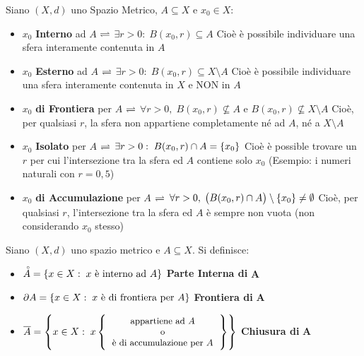 \begin{definition}
	\label{def:pti_e_spa_metr}
	Siano $(X,d)$ uno Spazio Metrico, $A \subseteq X$ e $x_0 \in X$:
	\begin{itemize}
		\item $x_0$ \textbf{Interno} ad $A$ \quad $\rightleftharpoons$ \quad $\exists r > 0:\; B(x_0, r) \subseteq A$\newline
			{\footnotesize Cioè è possibile individuare una sfera interamente contenuta in $A$}
		\item $x_0$ \textbf{Esterno} ad $A$ \quad $\rightleftharpoons$ \quad $\exists r > 0:\; B(x_0, r) \subseteq X \setminus A$\newline
			{\footnotesize Cioè è possibile individuare una sfera interamente contenuta in $X$ e NON in $A$}
		\item $x_0$ \textbf{di Frontiera} per $A$ \quad $\rightleftharpoons$ \quad $\forall r > 0,\; B(x_0, r) \nsubseteq A \text{ e } B(x_0, r) \nsubseteq X \setminus A$\newline
			{\footnotesize Cioè, per qualsiasi $r$, la sfera non appartiene completamente né ad $A$, né a $X \setminus A$}
		\item $x_0$ \textbf{Isolato} per $A$ \quad $\rightleftharpoons$ \quad $\exists r > 0:\; B(x_0, r) \cap A = \left\{x_0\right\}$\newline
			{\footnotesize Cioè è possible trovare un $r$ per cui l'intersezione tra la sfera ed $A$ contiene solo $x_0$ (Esempio: i numeri naturali con $r = 0,5$)}
		\item $x_0$ \textbf{di Accumulazione} per $A$ \quad $\rightleftharpoons$ \quad $\forall r > 0,\; \bigl( B(x_0, r) \cap A \bigr) \setminus \left\{x_0\right\} \neq \emptyset$\newline
			{\footnotesize Cioè, per qualsiasi $r$, l'intersezione tra la sfera ed $A$ è sempre non vuota (non considerando $x_0$ stesso)}
	\end{itemize}
\end{definition}
\begin{definition}
	\label{def:topologia_spa_metri}
	Siano $(X,d)$ uno spazio metrico e $A \subseteq X$. Si definisce:
	\begin{itemize}
		\item $\accentset{\circ}{A} = \left\{x \in X:\; x \text{ è interno ad } A\right\}$ \hfill \textbf{Parte Interna di} $\boldsymbol{A}$
		\item $\partial A = \left\{x \in X:\; x \text{ è di frontiera per } A\right\}$ \hfill \textbf{Frontiera di} $\boldsymbol{A}$
		\item $\overline{A} = \brackets{x \in X:\; x \brackets{\text{\small\begin{tabular}{c}appartiene ad $A$\\o\\è di accumulazione per $A$\end{tabular}}}}$ \hfill \textbf{Chiusura di} $\boldsymbol{A}$
	\end{itemize}
\end{definition}
